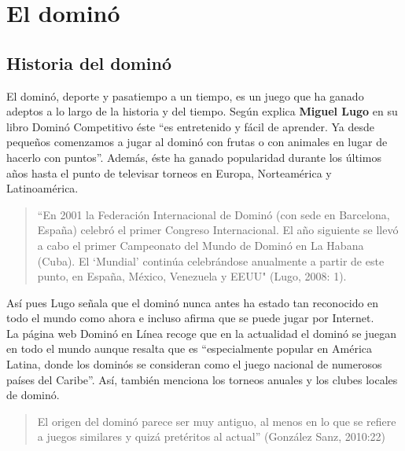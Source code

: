 

\section{El dominó}

\subsection{Historia del dominó}

El dominó, deporte y pasatiempo a un tiempo, es un juego que ha ganado adeptos a lo largo de la historia
y del tiempo. Según explica \textbf{Miguel Lugo} en su libro Dominó Competitivo \cite{lugo08} éste “es entretenido y fácil de
aprender. Ya desde pequeños comenzamos a jugar al dominó con frutas o con animales en lugar de hacerlo
con puntos”. Además, éste ha ganado popularidad durante los últimos años hasta el punto de televisar
torneos en Europa, Norteamérica y Latinoamérica.

\begin{quote}
“En 2001 la Federación Internacional de Dominó (con sede en Barcelona, España) celebró el primer
Congreso Internacional. El año siguiente se llevó a cabo el primer Campeonato del Mundo de Dominó en La
Habana (Cuba). El ‘Mundial’ continúa celebrándose anualmente a partir de este punto, en España, México,
Venezuela y EEUU" (Lugo, 2008: 1).
\end{quote}

Así pues Lugo señala que el dominó nunca antes ha estado tan reconocido en todo el mundo como ahora e
incluso afirma que se puede jugar por Internet. \\

La página web Dominó en Línea \cite{website:dominoenlinea} recoge que en la actualidad el dominó se juegan en todo el
mundo aunque resalta que es “especialmente popular en América Latina, donde los dominós se consideran
como el juego nacional de numerosos países del Caribe”. Así, también menciona los torneos anuales y
los clubes locales de dominó.

\begin{quote}
El origen del dominó parece ser muy antiguo, al menos en lo que se refiere a juegos similares y quizá
pretéritos al actual” (González Sanz, 2010:22)
\end{quote}

